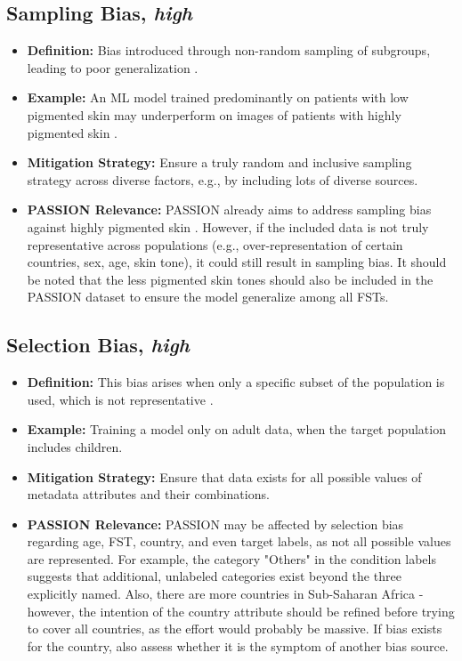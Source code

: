 \documentclass[12pt, a4paper, oneside]{book}   	%
\begin{document}
\begin{appendices}
		\subsection{Sampling Bias, \textit{high}}
		\begin{itemize}
			\item \textbf{Definition:} Bias introduced through non-random sampling of subgroups, leading to poor generalization \autocite{Mehrabi_2021}.
			\item \textbf{Example:} An \gls{ML} model trained predominantly on patients with low pigmented skin may underperform on images of patients with highly pigmented skin \autocite{Gottfrois2024}.
			\item \textbf{Mitigation Strategy:} Ensure a truly random and inclusive sampling strategy across diverse factors, e.g., by including lots of diverse sources.
			\item \textbf{PASSION Relevance:} PASSION already aims to address sampling bias against highly pigmented skin \autocite{Gottfrois2024}. However, if the included data is not truly representative across populations (e.g., over-representation of certain countries, sex, age, skin tone), it could still result in sampling bias.
			It should be noted that the less pigmented skin tones should also be included in the PASSION dataset to ensure the model generalize among all \glspl{FST}.
		\end{itemize}
		
		\subsection{Selection Bias, \textit{high}}
		\begin{itemize}
			\item \textbf{Definition:} This bias arises when only a specific subset of the population is used, which is not representative \autocites{Mester_2022, Mester_2017,Chakraborty_2024}.
			\item \textbf{Example:} Training a model only on adult data, when the target population includes children.
			\item \textbf{Mitigation Strategy:} Ensure that data exists for all possible values of metadata attributes and their combinations.
			\item \textbf{PASSION Relevance:} PASSION may be affected by selection bias regarding age, \gls{FST}, country, and even target labels, as not all possible values are represented. For example, the category "Others" in the condition labels suggests that additional, unlabeled categories exist beyond the three explicitly named. Also, there are more countries in Sub-Saharan Africa - however, the intention of the country attribute should be refined before trying to cover all countries, as the effort would probably be massive. If bias exists for the country, also assess whether it is the symptom of another bias source.
		\end{itemize}
		

\end{appendices}
\end{document}
